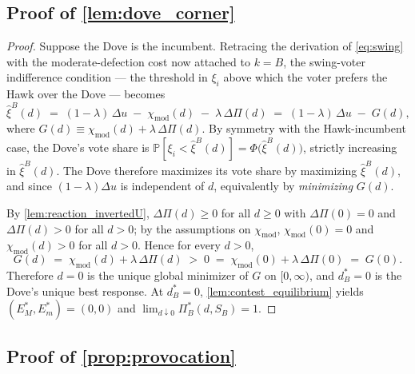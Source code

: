 \subsection*{Proof of \autoref{lem:dove_corner}} \label{app:proof:dove_corner}

\begin{proof}
Suppose the Dove is the incumbent. Retracing the derivation of \autoref{eq:swing} with the moderate-defection cost now attached to $k=B$, the swing-voter indifference condition — the threshold in $\xi_i$ above which the voter prefers the Hawk over the Dove — becomes
\[
\hat{\xi}^{B}(d)\;=\;(1-\lambda)\,\Delta u\;-\;\chi_{\mathrm{mod}}(d)\;-\;\lambda\,\Delta\Pi(d)\;=\;(1-\lambda)\,\Delta u\;-\;G(d),
\]
where $G(d)\equiv\chi_{\mathrm{mod}}(d)+\lambda\,\Delta\Pi(d)$. By symmetry with the Hawk-incumbent case, the Dove's vote share is $\mathbb{P}\!\left[\xi_i<\hat{\xi}^{B}(d)\right]=\Phi\!\big(\hat{\xi}^{B}(d)\big)$, strictly increasing in $\hat{\xi}^{B}(d)$. The Dove therefore maximizes its vote share by maximizing $\hat{\xi}^{B}(d)$, and since $(1-\lambda)\Delta u$ is independent of $d$, equivalently by \emph{minimizing} $G(d)$.

By \autoref{lem:reaction_invertedU}, $\Delta\Pi(d)\ge 0$ for all $d\ge 0$ with $\Delta\Pi(0)=0$ and $\Delta\Pi(d)>0$ for all $d>0$; by the assumptions on $\chi_{\mathrm{mod}}$, $\chi_{\mathrm{mod}}(0)=0$ and $\chi_{\mathrm{mod}}(d)>0$ for all $d>0$. Hence for every $d>0$,
\[
G(d)\;=\;\chi_{\mathrm{mod}}(d)+\lambda\,\Delta\Pi(d)\;>\;0\;=\;\chi_{\mathrm{mod}}(0)+\lambda\,\Delta\Pi(0)\;=\;G(0).
\]
Therefore $d=0$ is the unique global minimizer of $G$ on $[0,\infty)$, and $d_B^*=0$ is the Dove's unique best response. At $d_B^*=0$, \autoref{lem:contest_equilibrium} yields $(E_M^*,E_m^*)=(0,0)$ and $\lim_{d\downarrow 0}\Pi_B^*(d,S_B)=1$.
\end{proof}

\subsection*{Proof of \autoref{prop:provocation}} \label{app:proof:provocation}

